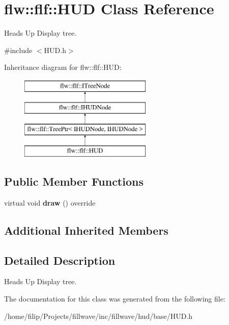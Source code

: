 \hypertarget{classflw_1_1flf_1_1HUD}{}\section{flw\+:\+:flf\+:\+:H\+UD Class Reference}
\label{classflw_1_1flf_1_1HUD}


Heads Up Display tree.  




{\ttfamily \#include $<$H\+U\+D.\+h$>$}

Inheritance diagram for flw\+:\+:flf\+:\+:H\+UD\+:\begin{figure}[H]
\begin{center}
\leavevmode
\includegraphics[height=4.000000cm]{classflw_1_1flf_1_1HUD}
\end{center}
\end{figure}
\subsection*{Public Member Functions}
\begin{DoxyCompactItemize}
\item 
virtual void {\bfseries draw} () override\hypertarget{classflw_1_1flf_1_1HUD_a3392d188f610fe9eba0c701236da0569}{}\label{classflw_1_1flf_1_1HUD_a3392d188f610fe9eba0c701236da0569}

\end{DoxyCompactItemize}
\subsection*{Additional Inherited Members}


\subsection{Detailed Description}
Heads Up Display tree. 

The documentation for this class was generated from the following file\+:\begin{DoxyCompactItemize}
\item 
/home/filip/\+Projects/fillwave/inc/fillwave/hud/base/H\+U\+D.\+h\end{DoxyCompactItemize}
